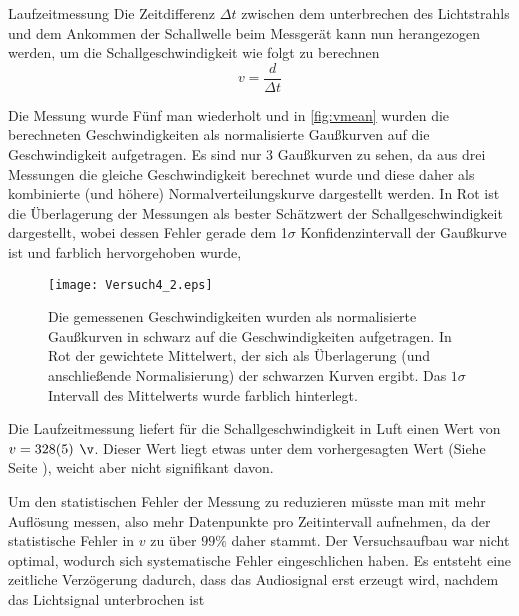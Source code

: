 \documentclass{alex_gp}
\begin{document}
\begin{mybox}{Laufzeitmessung}
	Die Zeitdifferenz \( \Delta t \) zwischen dem unterbrechen des Lichtstrahls und dem Ankommen der Schallwelle beim Messgerät kann nun herangezogen werden, um die Schallgeschwindigkeit wie folgt zu berechnen
	\begin{equation}\label{eqn:v1}
		v = \frac{d}{\Delta t}
	\end{equation}

	Die Messung wurde Fünf man wiederholt und in \autoref{fig:vmean} wurden die berechneten Geschwindigkeiten als normalisierte Gaußkurven auf die Geschwindigkeit aufgetragen. Es sind nur 3 Gaußkurven zu sehen, da aus drei Messungen die gleiche Geschwindigkeit berechnet wurde und diese daher als kombinierte (und höhere) Normalverteilungskurve dargestellt werden. In Rot ist die Überlagerung der Messungen als bester Schätzwert der Schallgeschwindigkeit dargestellt, wobei dessen Fehler gerade dem 1$\sigma$ Konfidenzintervall der Gaußkurve ist und farblich hervorgehoben wurde,
	\begin{figure}[H]	
		\centering
		\texttt{[image: Versuch4\_2.eps]}
		\caption{Die gemessenen Geschwindigkeiten wurden als normalisierte Gaußkurven in schwarz auf die Geschwindigkeiten aufgetragen. In Rot der gewichtete Mittelwert, der sich als Überlagerung (und anschließende Normalisierung) der schwarzen Kurven ergibt. Das \( 1\sigma \) Intervall des Mittelwerts wurde farblich hinterlegt.}
		\label{fig:vmean}
	\end{figure}

	Die Laufzeitmessung liefert für die Schallgeschwindigkeit in Luft einen Wert von \( v = 328(5) \unit{\v} \). Dieser Wert liegt etwas unter dem vorhergesagten Wert (Siehe Seite \pageref{eqn:cad}), weicht aber nicht signifikant davon. 
	
	Um den statistischen Fehler der Messung zu reduzieren müsste man mit mehr Auflösung messen, also mehr Datenpunkte pro Zeitintervall aufnehmen, da der statistische Fehler in \( v \) zu über \( 99 \% \) daher stammt. Der Versuchsaufbau war nicht optimal, wodurch sich systematische Fehler eingeschlichen haben. Es entsteht eine zeitliche Verzögerung dadurch, dass das Audiosignal erst erzeugt wird, nachdem das Lichtsignal unterbrochen ist
\end{mybox}
\end{document}

